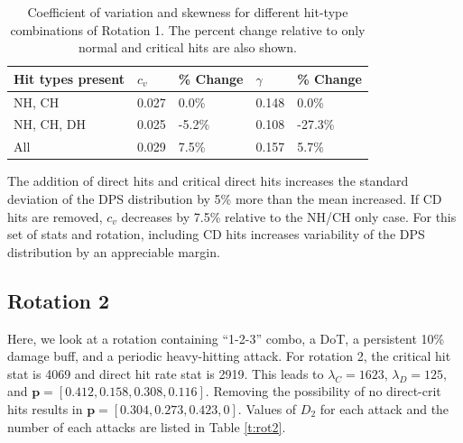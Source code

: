 \documentclass{article}
\begin{document}
            \begin{table}[H]
                \centering
                \caption{Coefficient of variation and skewness for different hit-type combinations of Rotation 1. The percent change relative to only normal and critical hits are also shown.}\label{t:r1-cv}
                \begin{tabular}{@{}lllll@{}}
                    \toprule
                    Hit types present & $c_v$ & \% Change & $\gamma$ & \% Change \\ \midrule
                    NH, CH            & 0.027 & 0.0\%     & 0.148    & 0.0\%     \\
                    NH, CH, DH        & 0.025 & -5.2\%    & 0.108    & -27.3\%   \\
                    All               & 0.029 & 7.5\%     & 0.157    & 5.7\%     \\ \bottomrule
                    \end{tabular}
                \end{table}
            
            The addition of direct hits and critical direct hits increases the standard deviation of the DPS distribution by 5\% more than the mean increased. If CD hits are removed, $c_v$ decreases by 7.5\% relative to the NH/CH only case. For this set of stats and rotation, including CD hits increases variability of the DPS distribution by an appreciable margin. 

        \subsection{Rotation 2}
            Here, we look at a rotation containing ``1-2-3'' combo, a DoT, a persistent 10\% damage buff, and a periodic heavy-hitting attack. For rotation 2, the critical hit stat is 4069 and direct hit rate stat is 2919. This leads to $\lambda_C = 1623$, $\lambda_D = 125$, and $\textbf{p} = [0.412, 0.158, 0.308, 0.116]$. Removing the possibility of no direct-crit hits results in $\textbf{p} = [0.304, 0.273, 0.423, 0]$. Values of $D_2$ for each attack and the number of each attacks are listed in Table \ref{t:rot2}.
\end{document}
